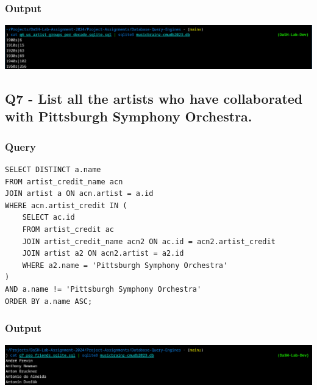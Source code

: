\documentclass[11pt]{article}
\begin{document}
\subsubsection{Output}
\label{sec:org5b792c3}
\begin{center}
\includegraphics[width=.9\linewidth]{./images/Q6.png}
\end{center}
\subsection{Q7 - List all the artists who have collaborated with Pittsburgh Symphony Orchestra.}
\label{sec:org5f33714}
\subsubsection{Query}
\label{sec:org938449e}
\begin{verbatim}
SELECT DISTINCT a.name
FROM artist_credit_name acn
JOIN artist a ON acn.artist = a.id
WHERE acn.artist_credit IN (
    SELECT ac.id
    FROM artist_credit ac
    JOIN artist_credit_name acn2 ON ac.id = acn2.artist_credit
    JOIN artist a2 ON acn2.artist = a2.id
    WHERE a2.name = 'Pittsburgh Symphony Orchestra'
)
AND a.name != 'Pittsburgh Symphony Orchestra'
ORDER BY a.name ASC;
\end{verbatim}
\subsubsection{Output}
\label{sec:org7ddbf7a}
\begin{center}
\includegraphics[width=.9\linewidth]{./images/Q7.png}
\end{center}
\end{document}

